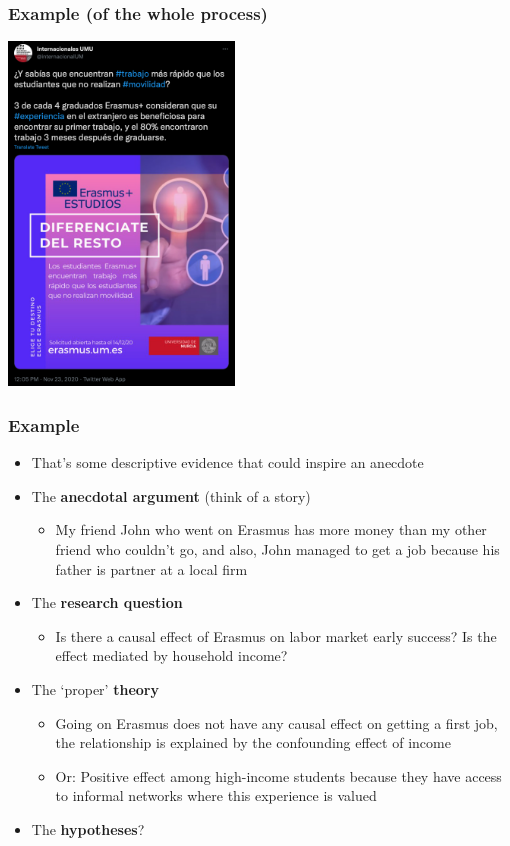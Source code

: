 \documentclass[aspectratio=43]{beamer}
\begin{document}
\begin{frame}
\frametitle{Example (of the whole process)}
\centering

\includegraphics[width = 0.45\textwidth]{../img/umu_erasmus}

\end{frame}

\begin{frame}
\frametitle{Example}
\centering

\begin{itemize}
  \item That's some descriptive evidence that could inspire an anecdote
  \item The \textbf{anecdotal argument} (think of a story)
  \begin{itemize}
    \item<2-> My friend John who went on Erasmus has more money than my other friend who couldn't go, and also, John managed to get a job because his father is partner at a local firm
  \end{itemize}
  \item The \textbf{research question}
  \begin{itemize}
    \item<2-> Is there a causal effect of Erasmus on labor market early success? Is the effect mediated by household income?
  \end{itemize}
  \item The `proper' \textbf{theory}
  \begin{itemize}
    \item<2-> Going on Erasmus does not have any causal effect on getting a first job, the relationship is explained by the confounding effect of income
    \item<2-> Or: Positive effect among high-income students because they have access to informal networks where this experience is valued
  \end{itemize}
  \item The \textbf{hypotheses}?
\end{itemize}

\end{frame}
\end{document}
